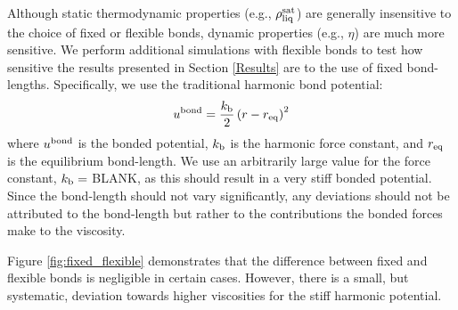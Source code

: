 \documentclass[preprint,review,12pt]{elsarticle}
\begin{document}
    Although static thermodynamic properties (e.g., $\rho_{\rm liq}^{\rm sat}$) are generally insensitive to the choice of fixed or flexible bonds, dynamic properties (e.g., $\eta$) are much more sensitive. We perform additional simulations with flexible bonds to test how sensitive the results presented in Section \ref{Results} are to the use of fixed bond-lengths. Specifically, we use the traditional harmonic bond potential:
    \begin{equation} \label{eq:harmonic_bond}
    u^{\rm bond} = \frac{k_{\rm b}}{2} \left(r-r_{\rm eq}\right)^2
    \end{equation}
    where $u^{\rm bond}$ is the bonded potential, $k_{\rm b}$ is the harmonic force constant, and $r_{\rm eq}$ is the equilibrium bond-length. We use an arbitrarily large value for the force constant, $k_{\rm b} = $ BLANK, as this should result in a very stiff bonded potential. Since the bond-length should not vary significantly, any deviations should not be attributed to the bond-length but rather to the contributions the bonded forces make to the viscosity. 
    
    Figure \ref{fig:fixed_flexible} demonstrates that the difference between fixed and flexible bonds is negligible in certain cases. However, there is a small, but systematic, deviation towards higher viscosities for the stiff harmonic potential. 
    
\end{document}
